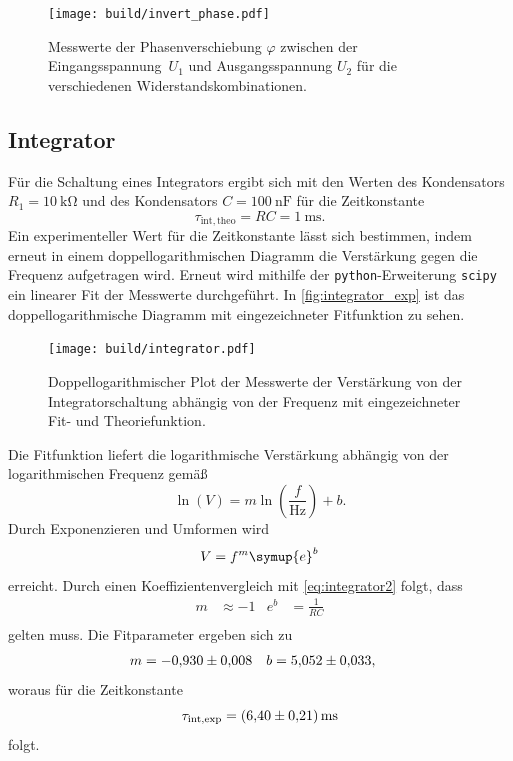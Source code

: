 \begin{figure}
  \centering
  \texttt{[image: build/invert\_phase.pdf]}
  \caption{Messwerte der Phasenverschiebung $\varphi$ zwischen der Eingangsspannung~$U_1$ und Ausgangsspannung $U_2$ für 
  die verschiedenen Widerstandskombinationen.}
  \label{fig:invert_phase}
\end{figure}


\subsection{Integrator}
Für die Schaltung eines Integrators ergibt sich mit den Werten des Kondensators $R_1=\qty{10}{\kilo\ohm}$ und des Kondensators $C=\qty{100}{\nano\farad}$ für die Zeitkonstante
\begin{equation*}
  \tau_{\mathrm{int, theo}} = RC = \qty{1}{\milli\second}.
\end{equation*}
Ein experimenteller Wert für die Zeitkonstante lässt sich bestimmen, indem erneut in einem doppellogarithmischen Diagramm die Verstärkung gegen die Frequenz aufgetragen wird. Erneut wird 
mithilfe der \texttt{python}-Erweiterung \texttt{scipy}~\cite{scipy} ein linearer Fit der Messwerte durchgeführt. In \autoref{fig:integrator_exp} ist das doppellogarithmische Diagramm mit 
eingezeichneter Fitfunktion zu sehen.

\begin{figure}
  \centering
  \texttt{[image: build/integrator.pdf]}
  \caption{Doppellogarithmischer Plot der Messwerte der Verstärkung von der Integratorschaltung abhängig von der Frequenz mit eingezeichneter Fit- und Theoriefunktion.}
  \label{fig:integrator_exp}
\end{figure}

Die Fitfunktion liefert die logarithmische Verstärkung abhängig von der logarithmischen Frequenz gemäß
\begin{equation*}
  \ln(V) = m \ln\left(\frac{f}{\unit{\hertz}}\right) + b.
\end{equation*}
Durch Exponenzieren und Umformen wird 
\begin{equation*}
  V = f^{m}\symup{e}^{b}
\end{equation*}
erreicht. Durch einen Koeffizientenvergleich mit \autoref{eq:integrator2} folgt, dass
\begin{align*}
  m &\approx -1 & e^{b} &=\frac{1}{RC} \\
\end{align*}
gelten muss. Die Fitparameter ergeben sich zu
\begin{align*}
  m &= \num{-0.930+-0.008} & b&= \num{5.052+-0.033},
\end{align*}
woraus für die Zeitkonstante
\begin{equation*}
  \tau_{\mathrm{int, exp}} = \qty{6.40+-0.21}{\milli\second}
\end{equation*}
folgt.

